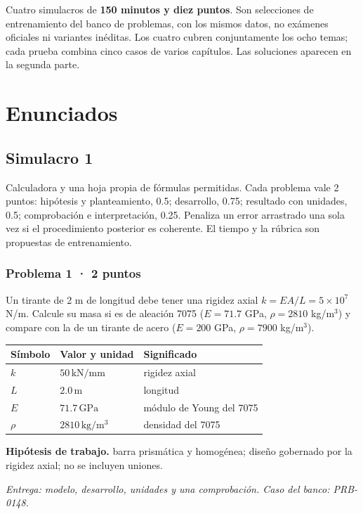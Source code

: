 \noindent Cuatro simulacros de \textbf{150 minutos y diez puntos}. Son selecciones de entrenamiento del banco de problemas, con los mismos datos, no exámenes oficiales ni variantes inéditas. Los cuatro cubren conjuntamente los ocho temas; cada prueba combina cinco casos de varios capítulos. Las soluciones aparecen en la segunda parte.
\tableofcontents\mainmatter\part{Enunciados}


\chapter{Simulacro 1}


Calculadora y una hoja propia de fórmulas permitidas. Cada problema vale 2 puntos: hipótesis y planteamiento, 0.5; desarrollo, 0.75; resultado con unidades, 0.5; comprobación e interpretación, 0.25. Penaliza un error arrastrado una sola vez si el procedimiento posterior es coherente. El tiempo y la rúbrica son propuestas de entrenamiento.

\par\medskip\noindent\begin{minipage}{\linewidth}

\section{Problema 1 · 2 puntos}

Un tirante de 2 m de longitud debe tener una rigidez axial $k = EA/L = 5\times 10^{7}$ N/m. Calcule su masa si es de aleación 7075 ($E = 71.7$ GPa, $\rho = 2810$ kg/m$^3$) y compare con la de un tirante de acero ($E = 200$ GPa, $\rho = 7900$ kg/m$^3$).

\par\medskip\noindent\begin{tabular}{@{}p{.18\linewidth}p{.26\linewidth}p{.48\linewidth}@{}}
\toprule Símbolo & Valor y unidad & Significado\\\midrule
$k$ & $50\,\mathrm{kN/mm}$ & rigidez axial\\
$L$ & $2.0\,\mathrm{m}$ & longitud\\
$E$ & $71.7\,\mathrm{GPa}$ & módulo de Young del 7075\\
$\rho$ & $2810\,\mathrm{kg/m^3}$ & densidad del 7075\\
\bottomrule\end{tabular}\par\medskip



\par\textbf{Hipótesis de trabajo.} barra prismática y homogénea; diseño gobernado por la rigidez axial; no se incluyen uniones.

\par\textit{Entrega: modelo, desarrollo, unidades y una comprobación. Caso del banco: PRB-0148.}\end{minipage}\par\medskip

